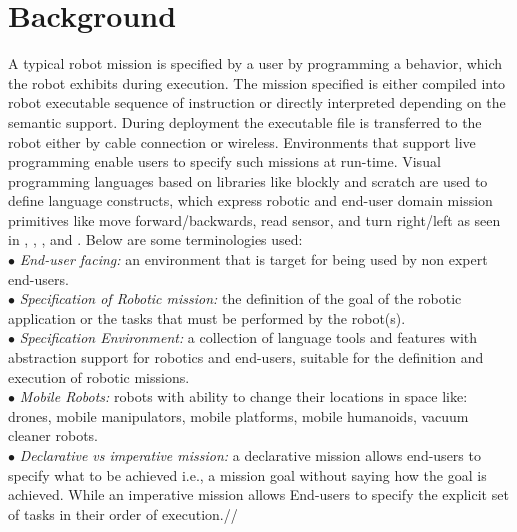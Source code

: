 \section{Background}
A typical robot mission is specified by a user by programming a behavior, which the robot exhibits during execution. The mission specified is either compiled into robot executable sequence of instruction or directly interpreted depending on the semantic support. During deployment the executable file is transferred to the robot either by cable connection or wireless. Environments that support live programming enable users to specify such missions at run-time. Visual programming languages based on libraries like blockly \cite{blockly} and scratch are used to define language constructs, which express robotic and end-user domain mission primitives like move forward/backwards, read sensor, and turn right/left as seen in \openroberta, \picaxe, \edison, and \sphero. Below are some terminologies used:\\%
$\bullet$ \emph{End-user facing:} an environment that is target for being used by non expert end-users.\\ %
$\bullet$ \emph{Specification of Robotic mission:} the definition of the goal of the robotic application or the tasks that must be performed by the robot(s). \\
$\bullet$ \emph{Specification  Environment:} a collection of language tools and features with abstraction support for robotics and end-users, suitable for the definition and execution of robotic missions.\\
$\bullet$ \emph{Mobile Robots:} robots with ability to change  their locations in space like: drones, mobile manipulators, mobile platforms, mobile humanoids, vacuum cleaner robots.\\
$\bullet$ \emph{Declarative vs imperative mission:} a declarative mission allows end-users to specify what to be achieved i.e., a mission goal without saying how the goal is achieved. While an  imperative mission allows End-users to specify the explicit set of tasks in their order of execution.// %
